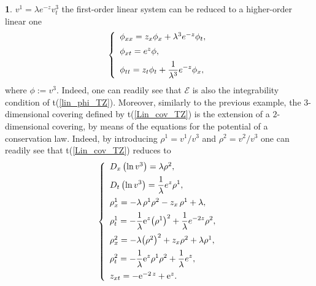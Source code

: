 \documentclass[12pt,english]{elsarticle}
\theoremstyle{plain}
\theoremstyle{plain}
\theoremstyle{remark}
\theoremstyle{plain}
\theoremstyle{definition}
\theoremstyle{definition}
\newtheorem{example}[thm]{\protect\examplename}
\providecommand{\examplename}{Example}
\begin{document}
\begin{example}
$v^{1}=\lambda e^{-z}v_{t}^{3}$ the first-order linear system can be reduced
to a higher-order linear one
%
\begin{equation}
\left \{
%
\begin{array}{l}
\phi _{xx}=z_{x}\phi _{x}+\lambda ^{3}e^{-z}\phi _{t},
\vspace{5pt}
\\
\phi _{xt}=e^{z}\phi ,
\vspace{5pt}
\\
{\displaystyle \phi _{tt}=z_{t}\phi _{t}+\frac{1}{\lambda ^{3}}e^{-z}
\phi _{x}},
\end{array}
%
\right .
\label{lin_phi_TZ}
\end{equation}
%
where $\phi :=v^{3}$. Indeed, one can readily see that $\mathcal{E}$ is
also the integrability condition of t{(\ref{lin_phi_TZ})}. Moreover, similarly
to the previous example, the $3$-dimensional covering defined by t{(\ref{Lin_cov_TZ})}
is the extension of a $2$-dimensional covering, by means of the equations
for the potential of a conservation law. Indeed, by introducing
$\rho ^{1}=v^{1}/v^{3}$ and $\rho ^{2}=v^{2}/v^{3}$ one can readily see
that t{(\ref{Lin_cov_TZ})} reduces to
%
\begin{equation*}
\left \{
%
\begin{array}{l}
D_{x}\left (\ln v^{3}\right )=\lambda{\rho ^{2}},
\vspace{5pt}
\\
{\displaystyle D_{t}\left (\ln v^{3}\right )=\frac{1}{\lambda}e^{z}{
\rho ^{1}}},
\vspace{5pt}
\\
\rho _{x}^{1}=-\lambda \,\rho ^{1}\rho ^{2}-z_{x}\,\rho ^{1}+\lambda ,
\vspace{5pt}
\\
{\displaystyle \rho _{t}^{1}=-\frac{1}{\lambda}{{\mathrm{e}}^{z}}{\left (
\rho ^{1}\right )}^{2}+\frac{1}{\lambda}e^{-2z}\rho ^{2}},
\vspace{5pt}
\\
\rho _{x}^{2}=-\lambda{\left (\rho ^{2}\right )}^{2}+z_{x}{\rho ^{2}}+
\lambda \rho ^{1},
\vspace{5pt}
\\
{\displaystyle \rho _{t}^{2}=-\frac{1}{\lambda}{{\mathrm{e}}^{z}}{\rho ^{1}}{
\rho ^{2}}+\frac{1}{\lambda}e^{z}},
\vspace{5pt}
\\
z_{xt}=-{{\mathrm{e}}^{-2\,z}}+{{\mathrm{e}}^{z}}.
\end{array}
%
\right .
\end{equation*}

\end{example}
\end{document}
